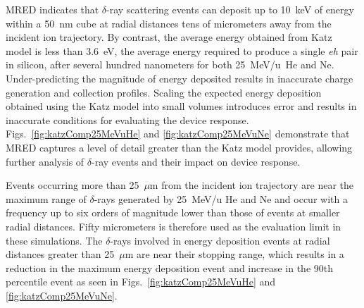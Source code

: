MRED indicates that $\delta$-ray scattering events can deposit up to 10~keV of energy within a 50~nm cube at radial distances tens of micrometers away from the incident ion trajectory.
By contrast, the average energy obtained from Katz model is less than 3.6~eV, the average energy required to produce a single \emph{eh} pair in silicon, after several hundred nanometers for both 25~MeV/u~He and Ne.
Under-predicting the magnitude of energy deposited results in inaccurate charge generation and collection profiles.
Scaling the expected energy deposition obtained using the Katz model into small volumes introduces error and results in inaccurate conditions for evaluating the device response.
Figs.~\ref{fig:katzComp25MeVuHe} and \ref{fig:katzComp25MeVuNe} demonstrate that MRED captures a level of detail greater than the Katz model provides, allowing further analysis of $\delta$-ray events and their impact on device response.

Events occurring more than 25~$\mu$m from the incident ion trajectory
are near the maximum range of $\delta$-rays generated by 25~MeV/u He 
and Ne and occur with a frequency up to six orders of magnitude lower 
than those of events at smaller radial distances.
Fifty micrometers is therefore used as the evaluation limit in these simulations.
The $\delta$-rays involved in energy deposition events at radial
distances greater than 25~$\mu$m are near their stopping range, 
which results in
a reduction in the maximum energy deposition event and increase in 
the 90th percentile event as seen in Figs.~\ref{fig:katzComp25MeVuHe}
and \ref{fig:katzComp25MeVuNe}.

